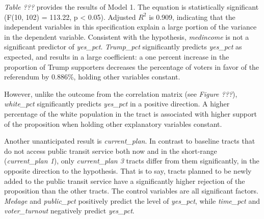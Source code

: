 \documentclass[
]{article}
\begin{document}
\emph{Table ???} provides the results of Model 1. The equation is
statistically significant (F(10, 102) = 113.22, p \textless{} 0.05).
Adjusted \(R^2\) is 0.909, indicating that the independent variables in
this specification explain a large portion of the variance in the
dependent variable. Consistent with the hypothesis, \emph{medincome} is
not a significant predictor of \emph{yes\_pct}. \emph{Trump\_pct}
significantly predicts \emph{yes\_pct} as expected, and results in a
large coefficient: a one percent increase in the proportion of Trump
supporters decreases the percentage of voters in favor of the referendum
by 0.886\%, holding other variables constant.

However, unlike the outcome from the correlation matrix (see
\emph{Figure ???}), \emph{white\_pct} significantly predicts
\emph{yes\_pct} in a positive direction. A higher percentage of the
white population in the tract is associated with higher support of the
proposition when holding other explanatory variables constant.

Another unanticipated result is \emph{current\_plan}. In contrast to
baseline tracts that do not access public transit service both now and
in the short-range (\emph{current\_plan 1}), only \emph{current\_plan 3}
tracts differ from them significantly, in the opposite direction to the
hypothesis. That is to say, tracts planned to be newly added to the
public transit service have a significantly higher rejection of the
proposition than the other tracts. The control variables are all
significant factors. \emph{Medage} and \emph{public\_pct} positively
predict the level of \emph{yes\_pct}, while \emph{time\_pct} and
\emph{voter\_turnout} negatively predict \emph{yes\_pct}.
\end{document}
